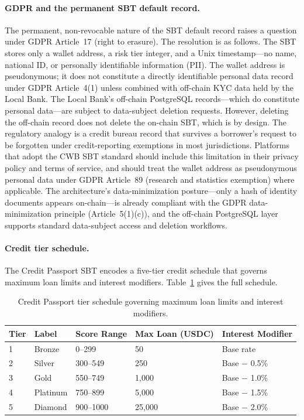 \documentclass[12pt,a4paper]{report}
\newcommand{\tableheadcolor}{\rowcolor{TableHeadBg}}
\begin{document}
\paragraph{GDPR and the permanent SBT default record.}
The permanent, non-revocable nature of the SBT default record raises a question under GDPR Article~17 (right to erasure). The resolution is as follows. The SBT stores only a wallet address, a risk tier integer, and a Unix timestamp---no name, national ID, or personally identifiable information (PII). The wallet address is pseudonymous; it does not constitute a directly identifiable personal data record under GDPR Article~4(1) unless combined with off-chain KYC data held by the Local Bank. The Local Bank's off-chain PostgreSQL records---which do constitute personal data---are subject to data-subject deletion requests. However, deleting the off-chain record does not delete the on-chain SBT, which is by design. The regulatory analogy is a credit bureau record that survives a borrower's request to be forgotten under credit-reporting exemptions in most jurisdictions. Platforms that adopt the CWB SBT standard should include this limitation in their privacy policy and terms of service, and should treat the wallet address as pseudonymous personal data under GDPR Article~89 (research and statistics exemption) where applicable. The architecture's data-minimization posture---only a hash of identity documents appears on-chain---is already compliant with the GDPR data-minimization principle (Article~5(1)(c)), and the off-chain PostgreSQL layer supports standard data-subject access and deletion workflows.

\paragraph{Credit tier schedule.}
The Credit Passport SBT encodes a five-tier credit schedule that governs maximum loan limits and interest modifiers. Table~\ref{tab:credit-tiers} gives the full schedule.

\begin{table}[H]
\centering
\caption[Credit Passport tier schedule]{Credit Passport tier schedule governing maximum loan limits and interest modifiers.}
\label{tab:credit-tiers}
\begin{tabular}{p{0.8cm}p{2.2cm}p{2.6cm}p{3.2cm}p{3.8cm}}
\toprule
\tableheadcolor
\textbf{Tier} & \textbf{Label} & \textbf{Score Range} & \textbf{Max Loan (USDC)} & \textbf{Interest Modifier} \\
\midrule
1 & Bronze & 0--299 & 50 & Base rate \\
2 & Silver & 300--549 & 250 & Base $-$ 0.5\% \\
3 & Gold & 550--749 & 1,000 & Base $-$ 1.0\% \\
4 & Platinum & 750--899 & 5,000 & Base $-$ 1.5\% \\
5 & Diamond & 900--1000 & 25,000 & Base $-$ 2.0\% \\
\bottomrule
\end{tabular}
\end{table}
\end{document}
